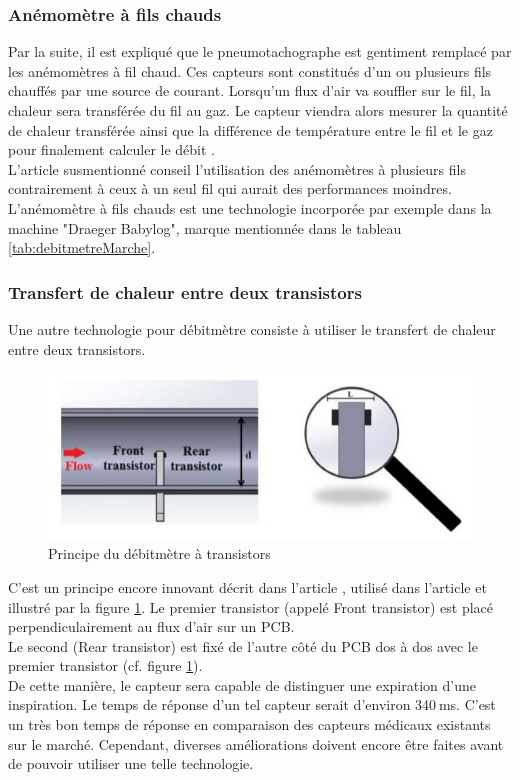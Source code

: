 \subsubsection{Anémomètre à fils chauds}
Par la suite, il est expliqué que le pneumotachographe est gentiment remplacé par les anémomètres à fil chaud. Ces capteurs sont 
constitués d'un ou plusieurs fils chauffés par une source de courant. Lorsqu'un flux d'air va souffler sur le fil, la chaleur sera 
transférée du fil au gaz. Le capteur viendra alors mesurer la quantité de chaleur transférée ainsi que la différence de température entre 
le fil et le gaz pour finalement calculer le débit \cite{oberg_biomedical_2011}. \\
L'article susmentionné conseil l'utilisation des anémomètres à plusieurs fils contrairement à ceux à un seul fil qui aurait des performances 
moindres. 
L'anémomètre à fils chauds est une technologie incorporée par exemple dans la machine "Draeger Babylog", marque mentionnée dans le tableau \ref{tab:debitmetreMarche}. 

\subsubsection{Transfert de chaleur entre deux transistors}

Une autre technologie pour débitmètre consiste à utiliser le transfert de chaleur entre deux transistors. 
\begin{figure}[H]
    \centering
    \includegraphics[scale = 0.5]{images/Debitmetre_transistors.png}
    \caption{Principe du débitmètre à transistors}
    \label{fig:transistors}
\end{figure}

C'est un principe encore innovant décrit dans l'article \cite{giorgino_design_2014}, utilisé dans l'article \cite{rosi_device_2016} et illustré 
par la figure \ref{fig:transistors}. 
Le premier transistor (appelé Front transistor) est placé perpendiculairement au flux d'air sur un PCB. \\
Le second (Rear transistor) est fixé de l'autre côté du PCB dos à dos avec le premier transistor (cf. figure \ref{fig:transistors}). \\
De cette manière, le capteur sera capable de distinguer une expiration d'une inspiration. Le temps de réponse d'un tel capteur serait 
d'environ 340 ms. C'est un très bon temps de réponse en comparaison des capteurs médicaux existants sur le marché. Cependant, diverses améliorations 
doivent encore être faites avant de pouvoir utiliser une telle technologie. 

